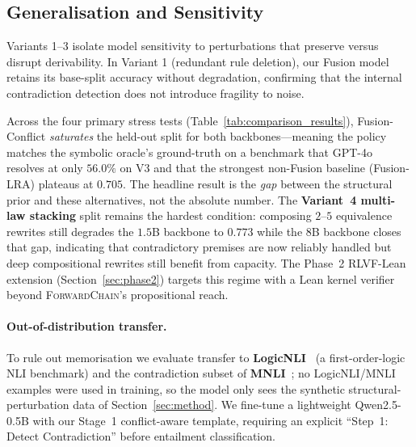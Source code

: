 \documentclass{article} %
\begin{document}
\subsection{Generalisation and Sensitivity}
Variants 1--3 isolate model sensitivity to perturbations that preserve versus disrupt derivability. In Variant 1 (redundant rule deletion), our Fusion model retains its base-split accuracy without degradation, confirming that the internal contradiction detection does not introduce fragility to noise.

Across the four primary stress tests (Table~\ref{tab:comparison_results}), Fusion-Conflict \emph{saturates} the held-out split for both backbones---meaning the policy matches the symbolic oracle's ground-truth on a benchmark that GPT-4o resolves at only $56.0\%$ on V3 and that the strongest non-Fusion baseline (Fusion-LRA) plateaus at $0.705$. The headline result is the \emph{gap} between the structural prior and these alternatives, not the absolute number. The \textbf{Variant~4 multi-law stacking} split remains the hardest condition: composing $2$--$5$ equivalence rewrites still degrades the $1.5$B backbone to $0.773$ while the $8$B backbone closes that gap, indicating that contradictory premises are now reliably handled but deep compositional rewrites still benefit from capacity. The Phase~2 RLVF-Lean extension (Section~\ref{sec:phase2}) targets this regime with a Lean kernel verifier beyond \textsc{ForwardChain}'s propositional reach.

\paragraph{Out-of-distribution transfer.} To rule out memorisation we evaluate transfer to \textbf{LogicNLI}~\cite{tian-etal-2021-diagnosing} (a first-order-logic NLI benchmark) and the contradiction subset of \textbf{MNLI}~\cite{N18-1101}; no LogicNLI/MNLI examples were used in training, so the model only sees the synthetic structural-perturbation data of Section~\ref{sec:method}. We fine-tune a lightweight Qwen2.5-0.5B with our Stage~1 conflict-aware template, requiring an explicit ``Step~1: Detect Contradiction'' before entailment classification.
\end{document}
